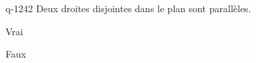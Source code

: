 \begin{truefalse}{q-1242}
Deux droites disjointes dans le plan sont parallèles.
\item* Vrai
\item Faux
\end{truefalse}

